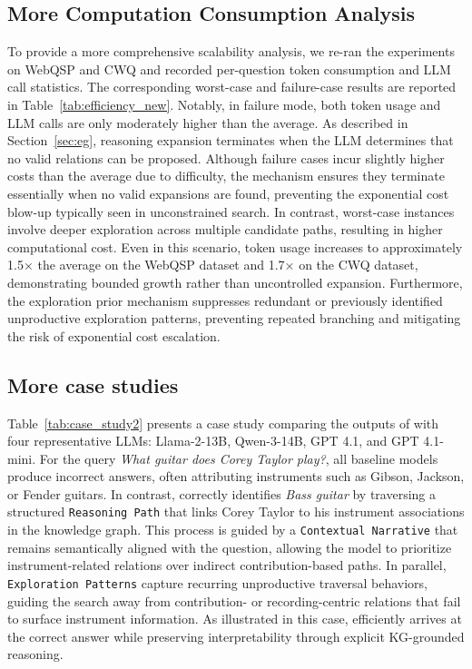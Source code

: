 \subsection{More Computation Consumption Analysis}\label{sec:computation}

To provide a more comprehensive scalability analysis, we re-ran the experiments on WebQSP and CWQ and recorded per-question token consumption and LLM call statistics. The corresponding worst-case and failure-case results are reported in Table~\ref{tab:efficiency_new}. Notably, in failure mode, both token usage and LLM calls are only moderately higher than the average. As described in Section~\ref{sec:eg}, reasoning expansion terminates when the LLM determines that no valid relations can be proposed. Although failure cases incur slightly higher costs than the average due to difficulty, the mechanism ensures they terminate essentially when no valid expansions are found, preventing the exponential cost blow-up typically seen in unconstrained search. In contrast, worst-case instances involve deeper exploration across multiple candidate paths, resulting in higher computational cost. Even in this scenario, token usage increases to approximately 1.5× the average on the WebQSP dataset and 1.7× on the CWQ dataset, demonstrating bounded growth rather than uncontrolled expansion. Furthermore, the exploration prior mechanism suppresses redundant or previously identified unproductive exploration patterns, preventing repeated branching and mitigating the risk of exponential cost escalation.

\subsection{More case studies}\label{sec:case_study}

Table~\ref{tab:case_study2} presents a case study comparing the outputs of \method{} with four representative LLMs: Llama-2-13B, Qwen-3-14B, GPT 4.1, and GPT 4.1-mini. For the query \textit{What guitar does Corey Taylor play?}, all baseline models produce incorrect answers, often attributing instruments such as Gibson, Jackson, or Fender guitars. In contrast, \method{} correctly identifies \textit{Bass guitar} by traversing a structured \texttt{Reasoning Path} that links Corey Taylor to his instrument associations in the knowledge graph. This process is guided by a \texttt{Contextual Narrative} that remains semantically aligned with the question, allowing the model to prioritize instrument-related relations over indirect contribution-based paths. In parallel, \texttt{Exploration Patterns} capture recurring unproductive traversal behaviors, guiding the search away from contribution- or recording-centric relations that fail to surface instrument information. As illustrated in this case, \method{} efficiently arrives at the correct answer while preserving interpretability through explicit KG-grounded reasoning.


